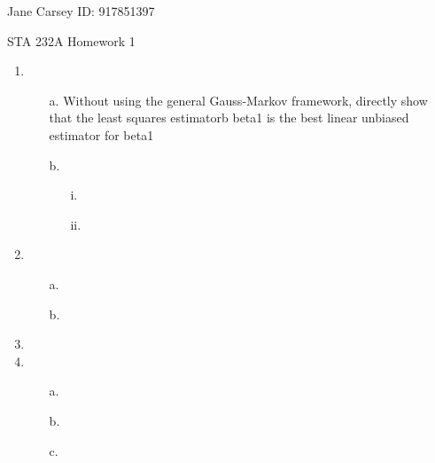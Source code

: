 \documentclass[letterpaper,12pt]{article}
\begin{document}
\begin{flushright} \large{Jane Carsey ID: 917851397} \end{flushright}
\large{STA 232A Homework 1} 


\begin{enumerate}
\item
\begin{enumerate}
\item[a.]
Without using the general Gauss-Markov framework, directly show that the least squares estimatorb beta1 is the best linear unbiased estimator for beta1

\item[b.]
\begin{enumerate}
\item[i.]

\item[ii.]

\end{enumerate}
\end{enumerate}


\item
\begin{enumerate}
\item[a.]


\item[b.]

\end{enumerate}


\item



\item
\begin{enumerate}

\item[a.]

\item[b.]

\item[c.]

\end{enumerate}
\end{enumerate}
\end{document}
